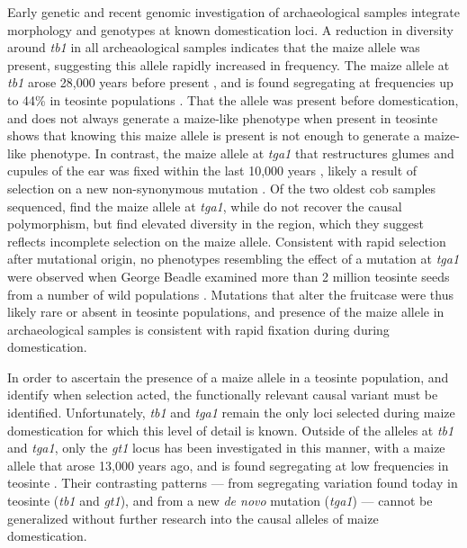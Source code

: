 \documentclass[9pt,twocolumn,twoside]{rilabRxiv}
\begin{document}
﻿Early genetic \citep{jaenickedespres2003} and recent genomic  \citep{fonseca2015,  ramosmadrigal2016, vallebueno2016, swarts2017} investigation of archaeological samples integrate morphology and genotypes at known domestication loci.
A reduction in diversity around \textit{tb1} in all archeaological samples indicates that the maize allele was present, suggesting this allele rapidly increased in frequency.
The maize allele at \textit{tb1} arose 28,000 years before present \citep{studer2011}, and is found segregating at frequencies up to 44\% in teosinte populations \citep{studer2011, vann2015}.
That the allele was present before domestication, and does not always generate a maize-like phenotype when present in teosinte \citep{vann2015} shows that knowing this maize allele is present is not enough to generate a maize-like phenotype. 
In contrast, the maize allele at \textit{tga1} that restructures glumes and cupules of the ear was fixed within the last 10,000 years \citep{wang2005}, likely a result of selection on a new non-synonymous mutation \citep{wang2015}.
Of the two oldest cob samples sequenced, \citet{ramosmadrigal2016} find the maize allele at \textit{tga1}, while \citet{vallebueno2016} do not recover the causal polymorphism, but find elevated diversity in the region, which they suggest reflects incomplete selection on the maize allele.
﻿Consistent with rapid selection after mutational origin, no phenotypes resembling the effect of a mutation at \textit{tga1} were observed when George Beadle examined more than 2 million teosinte seeds from a number of wild populations  \citep{beadle1980, bergsingerbook}.
﻿Mutations that alter the fruitcase were thus likely rare or absent in teosinte populations, and presence of the maize allele in archaeological samples is consistent with rapid fixation during during domestication.

﻿In order to ascertain the presence of a maize allele in a teosinte population, and identify when selection acted, the functionally relevant causal variant must be identified.
Unfortunately, \textit{tb1} and \textit{tga1} remain the only loci selected during maize domestication for which this level of detail is known.
Outside of the alleles at \textit{tb1} and \textit{tga1}, only the \textit{gt1} locus has been investigated in this manner, with a maize allele that arose 13,000 years ago, and is found segregating at low frequencies in teosinte \citep{wills2013}.
Their contrasting patterns --- from segregating variation found today in teosinte (\textit{tb1} and \textit{gt1}), and from a new \textit{de novo} mutation (\textit{tga1}) --- cannot be generalized without further research into the causal alleles of maize domestication. 
\end{document}
